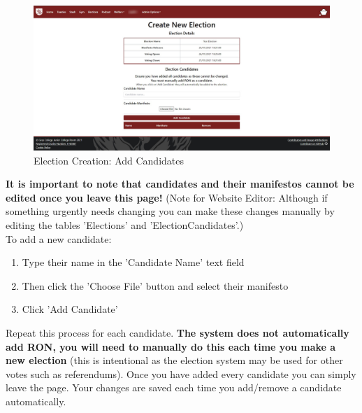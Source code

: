 \documentclass{article}
\begin{document}
\begin{figure}[H]
    \centering
    \includegraphics[width=\textwidth,height=\textheight,keepaspectratio]{elections/add_candidate_screen.png}
    \caption{Election Creation: Add Candidates}
    \label{fig:election_add_candidate}
\end{figure}
\textbf{It is important to note that candidates and their manifestos cannot be edited once you leave this page!} (Note for Website Editor: Although if something urgently needs changing you can make these changes manually by editing the tables 'Elections' and 'ElectionCandidates'.)
\\[12pt]
To add a new candidate:
\begin{enumerate}
    \item Type their name in the 'Candidate Name' text field
    \item Then click the 'Choose File' button and select their manifesto
    \item Click 'Add Candidate'
\end{enumerate}
Repeat this process for each candidate. \textbf{The system does not automatically add RON, you will need to manually do this each time you make a new election} (this is intentional as the election system may be used for other votes such as referendums). Once you have added every candidate you can simply leave the page. Your changes are saved each time you add/remove a candidate automatically. 
\end{document}
